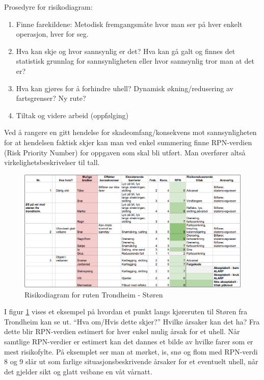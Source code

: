 \documentclass[a4paper,norsk,oneside]{book}
\begin{document}
Prosedyre for risikodiagram:
\begin{enumerate}
\item Finne farekildene: Metodisk fremgangsmåte hvor man ser på hver enkelt operasjon, hver for seg.
\item Hva kan skje og hvor sannsynlig er det? Hva kan gå galt og finnes det statistisk grunnlag for sannsynligheten eller hvor sannsynlig tror man at det er?
\item Hva kan gjøres for å forhindre uhell? Dynamisk økning/redusering av fartsgrenser? Ny rute?
\item Tiltak og videre arbeid (oppfølging)
\end{enumerate}

Ved å rangere en gitt hendelse for skadeomfang/konsekvens mot sannsynligheten for at hendelsen faktisk skjer kan man ved enkel summering finne RPN-verdien (Risk Priority Number) for oppgaven som skal bli utført. Man overfører altså virkelighetsbeskrivelser til tall.  


\begin{figure}[H]
\centering
\includegraphics[scale=0.25]{figs/risiko1}
\caption{Risikodiagram for ruten Trondheim - Støren}
\label{fig:risiko1}
\end{figure}

\noindent
I figur \ref{fig:risiko1} vises et eksempel på hvordan et punkt langs kjøreruten til Støren fra Trondheim kan se ut. “Hva om/Hvis dette skjer?” Hvilke årsaker kan det ha? Fra dette blir RPN-verdien estimert for hver enkel mulig årsak for et uhell. Når samtlige RPN-verdier er estimert kan det dannes et bilde av hvilke farer som er mest risikofylte. På eksemplet ser man at mørket, is, snø og flom med RPN-verdi 8 og 9 slår ut som farlige situasjonsbeskrivende årsaker for et eventuelt uhell, når det gjelder sikt og glatt veibane en våt vårnatt.
\end{document}
